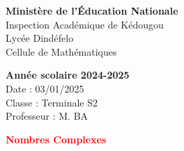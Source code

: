 \documentclass[12pt]{article}
\begin{document}
\noindent
\begin{minipage}[t]{0.48\textwidth}
\raggedright
\textbf{Ministère de l'Éducation Nationale}\\
Inspection Académique de Kédougou\\
Lycée Dindéfelo\\
Cellule de Mathématiques
\end{minipage}
\hfill
\begin{minipage}[t]{0.48\textwidth}
\raggedleft
\textbf{Année scolaire 2024-2025}\\
Date : 03/01/2025\\
Classe : Terminale S2\\
Professeur : M. BA
\end{minipage}
\vspace{1cm}
\begin{center}
\textbf{\textcolor{red}{Nombres Complexes}}
\end{center}
\vspace{1cm}
\end{document}

